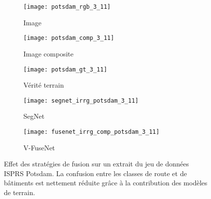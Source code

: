 \begin{figure}[h]
	\begin{subfigure}{0.32\textwidth}
    \texttt{[image: potsdam\_rgb\_3\_11]}
    \caption{Image }
    \end{subfigure}
    \begin{subfigure}{0.32\textwidth}
    \texttt{[image: potsdam\_comp\_3\_11]}
    \caption{Image composite}
    \end{subfigure}
    \begin{subfigure}{0.32\textwidth}
    \texttt{[image: potsdam\_gt\_3\_11]}
    \caption{Vérité terrain}
    \end{subfigure}
    \begin{subfigure}{0.49\textwidth}
    \texttt{[image: segnet\_irrg\_potsdam\_3\_11]}
    \caption{SegNet}
    \end{subfigure}
    \begin{subfigure}{0.49\textwidth}
    \texttt{[image: fusenet\_irrg\_comp\_potsdam\_3\_11]}
    \caption{V-FuseNet}
    \end{subfigure}
    \caption{Effet des stratégies de fusion sur un extrait du jeu de données \gls{ISPRS} Potsdam. La confusion entre les classes de route et de bâtiments est nettement réduite grâce à la contribution des modèles de terrain.\\\isprslegende}
    \label{fig:potsdam_images}
\end{figure}

